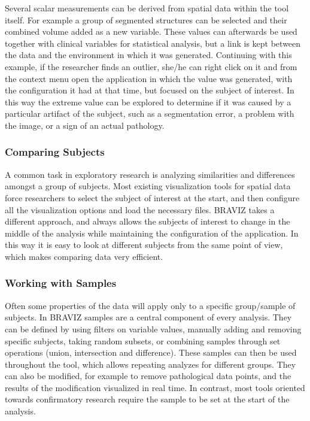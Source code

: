 \documentclass{frontiersHLTH}
\begin{document}
Several scalar measurements can be derived from spatial data within the tool itself. For example a group of segmented structures can be selected and their combined volume added as a new variable. These values can afterwards be used together with clinical variables for statistical analysis, but a link is kept between the data and the environment in which it was generated. Continuing with this example, if the researcher finds an outlier, she/he can right click on it and from the context menu open the application in which the value was generated, with the configuration it had at that time, but focused on the subject of interest. In this way the extreme value can be explored to determine if it was caused by a particular artifact of the subject, such as a segmentation error, a problem with the image, or a sign of an actual pathology.

\subsubsection{Comparing Subjects}

A common task in exploratory research is analyzing similarities and differences amongst a group of subjects. Most existing visualization tools for spatial data force researchers to select the subject of interest at the start, and then configure all the visualization options and load the necessary files. BRAVIZ takes a different approach, and always allows the subjects of interest to change in the middle of the analysis while maintaining the configuration of the application. In this way it is easy to look at different subjects from the same point of view, which makes comparing data very efficient.  

\subsubsection{Working with Samples}
\label{subsamples}
Often some properties of the data will apply only to a specific group/sample of subjects. In BRAVIZ samples are a central component of every analysis. They can be defined by using filters on variable values, manually adding and removing specific subjects, taking random subsets, or combining samples through set operations (union, intersection and difference). These samples can then be used throughout the tool, which allows repeating analyzes for different groups. They can also be modified, for example to remove pathological data points, and the results of the modification visualized in real time. In contrast, most tools oriented towards confirmatory research require the sample to be set at the start of the analysis.
\end{document}
